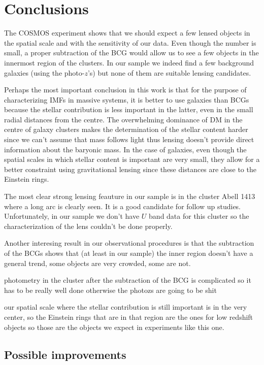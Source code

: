 \chapter{Conclusions}

The COSMOS experiment shows that we should expect a few lensed objects in the spatial scale and with the sensitivity of our data. Even though the number is small, a proper subtraction of the BCG would allow us to see a few objects in the innermost region of the clusters. In our sample we indeed find a few background galaxies (using the photo-$z$'s) but none of them are suitable lensing candidates.

Perhaps the most important conclusion in this work is that for the purpose of characterizing IMFs in massive systems, it is better to use galaxies than BCGs because the stellar contribution is less important in the latter, even in the small radial distances from the centre. The overwhelming dominance of DM in the centre of galaxy clusters makes the determination of the stellar content harder since we can't assume that mass follows light thus lensing doesn't provide direct information about the baryonic mass. In the case of galaxies, even though the spatial scales in which stellar content is important are very small, they allow for a better constraint using gravitational lensing since these distances are close to the Einstein rings.

The most clear strong lensing feauture in our sample is in the cluster Abell 1413 where a long arc is clearly seen. It is a good candidate for follow up studies. Unfortunately, in our sample we don't have $U$ band data for this cluster so the characterization of the lens couldn't be done properly. 

Another interesing result in our observational procedures is that the subtraction of the BCGs shows that (at least in our sample) the inner region doesn't have a general trend, some objects are very crowded, some are not.

photometry in the cluster after the subtraction of the BCG is complicated so it has to be really well done otherwise the photozs are going to be shit

our spatial scale where the stellar contribution is still important is in the very center, so the Einstein rings that are in that region are the ones for low redshift objects so those are the objects we expect in experiments like this one.

\section{Possible improvements}

